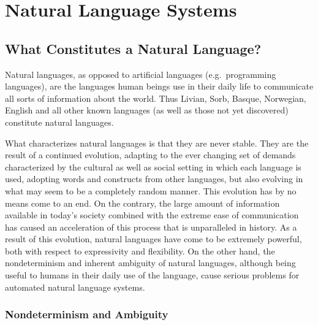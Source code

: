 
\section{Natural Language Systems}
\label{nls}

\subsection{What Constitutes a Natural Language?}
\label{nla}

Natural languages, as opposed to artificial languages (e.g.\
programming languages), are the languages human beings use in their
daily life to communicate all sorts of information about the world.
Thus Livian, Sorb, Basque, Norwegian, English and all other known
languages (as well as those not yet discovered) constitute natural
languages.

What characterizes natural languages is that they are never stable.
They are the result of a continued evolution, adapting to the ever
changing set of demands characterized by the cultural as well as
social setting in which each language is used, adopting words and
constructs from other languages, but also evolving in what may seem to
be a completely random manner.  This evolution has by no means come to
an end. On the contrary, the large amount of information available in
today's society combined with the extreme ease of communication has
caused an acceleration of this process that is unparalleled in
history. As a result of this evolution, natural languages have come to
be extremely powerful, both with respect to expressivity and
flexibility. On the other hand, the nondeterminism and inherent
ambiguity of natural languages, although being useful to humans in
their daily use of the language, cause serious problems for automated
natural language systems.

\subsubsection{Nondeterminism and Ambiguity}


